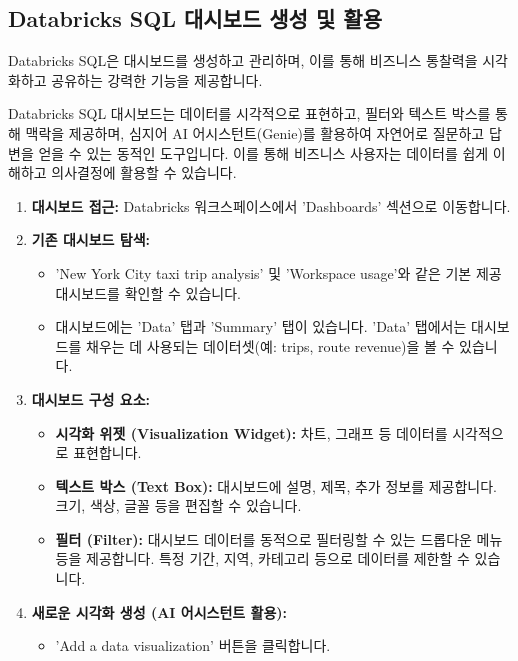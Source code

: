 \documentclass[11pt,a4paper]{article}
\theoremstyle{definition}
\begin{document}
\subsection{Databricks SQL 대시보드 생성 및 활용}
Databricks SQL은 대시보드를 생성하고 관리하며, 이를 통해 비즈니스 통찰력을 시각화하고 공유하는 강력한 기능을 제공합니다.

\begin{summarybox}[title=핵심 요약: 대시보드로 데이터 스토리텔링]
Databricks SQL 대시보드는 데이터를 시각적으로 표현하고, 필터와 텍스트 박스를 통해 맥락을 제공하며, 심지어 AI 어시스턴트(Genie)를 활용하여 자연어로 질문하고 답변을 얻을 수 있는 동적인 도구입니다. 이를 통해 비즈니스 사용자는 데이터를 쉽게 이해하고 의사결정에 활용할 수 있습니다.
\end{summarybox}

\begin{enumerate}
    \item \textbf{대시보드 접근:} Databricks 워크스페이스에서 'Dashboards' 섹션으로 이동합니다.
    \item \textbf{기존 대시보드 탐색:}
    \begin{itemize}
        \item 'New York City taxi trip analysis' 및 'Workspace usage'와 같은 기본 제공 대시보드를 확인할 수 있습니다.
        \item 대시보드에는 'Data' 탭과 'Summary' 탭이 있습니다. 'Data' 탭에서는 대시보드를 채우는 데 사용되는 데이터셋(예: trips, route revenue)을 볼 수 있습니다.
    \end{itemize}
    \item \textbf{대시보드 구성 요소:}
    \begin{itemize}
        \item \textbf{시각화 위젯 (Visualization Widget):} 차트, 그래프 등 데이터를 시각적으로 표현합니다.
        \item \textbf{텍스트 박스 (Text Box):} 대시보드에 설명, 제목, 추가 정보를 제공합니다. 크기, 색상, 글꼴 등을 편집할 수 있습니다.
        \item \textbf{필터 (Filter):} 대시보드 데이터를 동적으로 필터링할 수 있는 드롭다운 메뉴 등을 제공합니다. 특정 기간, 지역, 카테고리 등으로 데이터를 제한할 수 있습니다.
    \end{itemize}
    \item \textbf{새로운 시각화 생성 (AI 어시스턴트 활용):}
    \begin{itemize}
        \item 'Add a data visualization' 버튼을 클릭합니다.

\end{itemize}
\end{enumerate}
\end{document}
